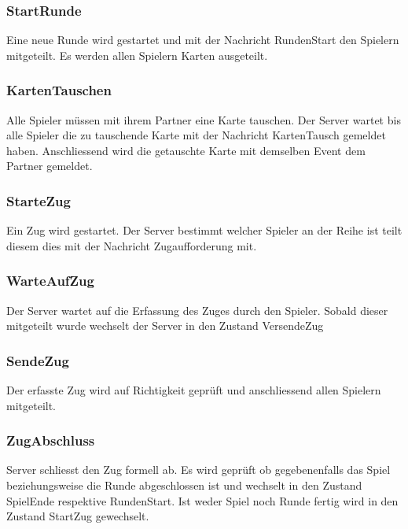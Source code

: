 \documentclass[12pt,halfparskip]{scrartcl}
\begin{document}

\subsubsection{StartRunde} %
\label{ssub:startrunde}
Eine neue Runde wird gestartet und mit der Nachricht RundenStart den Spielern mitgeteilt. Es werden allen Spielern Karten ausgeteilt.


\subsubsection{KartenTauschen} %
\label{ssub:kartentauschen}
Alle Spieler müssen mit ihrem Partner eine Karte tauschen. Der Server wartet bis alle Spieler die zu tauschende Karte mit der Nachricht KartenTausch gemeldet haben. Anschliessend wird die getauschte Karte mit demselben Event dem Partner gemeldet.


\subsubsection{StarteZug} %
\label{ssub:startezug}
Ein Zug wird gestartet. Der Server bestimmt welcher Spieler an der Reihe ist teilt diesem dies mit der Nachricht Zugaufforderung mit. 


\subsubsection{WarteAufZug} %
\label{ssub:warteaufzug}
Der Server wartet auf die Erfassung des Zuges durch den Spieler. Sobald dieser mitgeteilt wurde wechselt der Server in den Zustand VersendeZug 

\subsubsection{SendeZug} %
\label{ssub:sendezug}

Der erfasste Zug wird auf Richtigkeit geprüft und anschliessend allen Spielern mitgeteilt.


\subsubsection{ZugAbschluss} %
\label{ssub:zugabschluss}
Server schliesst den Zug formell ab. Es wird geprüft ob gegebenenfalls das Spiel beziehungsweise die Runde abgeschlossen ist und wechselt in den Zustand SpielEnde respektive RundenStart. Ist weder Spiel noch Runde fertig wird in den Zustand StartZug gewechselt.
\end{document}
